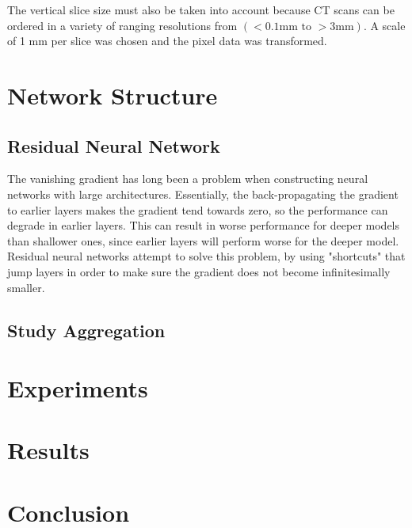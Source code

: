 \documentclass[10pt,twocolumn,letterpaper]{article}
\begin{document}
         The vertical slice size must also be taken into account because CT scans can be ordered in a variety of 
         ranging resolutions from $(<0.1\text{mm to } >3 \text{mm})$. A scale of 1 mm per slice was chosen and the
         pixel data was transformed.

\section{Network Structure} \label{sec:struct}

   \subsection{Residual Neural Network} \label{sec:struct-cnn}
        The vanishing gradient has long been a problem when constructing neural networks with large architectures.
        Essentially, the back-propagating the gradient to earlier layers makes the gradient tend towards zero,
        so the performance can degrade in earlier layers. This can result in worse performance for deeper models
        than shallower ones, since earlier layers will perform worse for the deeper model. Residual neural networks
         attempt to solve this problem, by using "shortcuts" that jump layers in order to make sure the gradient
         does not become infinitesimally smaller.


   \subsection{Study Aggregation} \label{sec:struct-aggr}

\section{Experiments} \label{sec:experiments}

\section{Results} \label{sec:results}

\section{Conclusion} \label{sec:conclusion}

{\small


}
\end{document}
